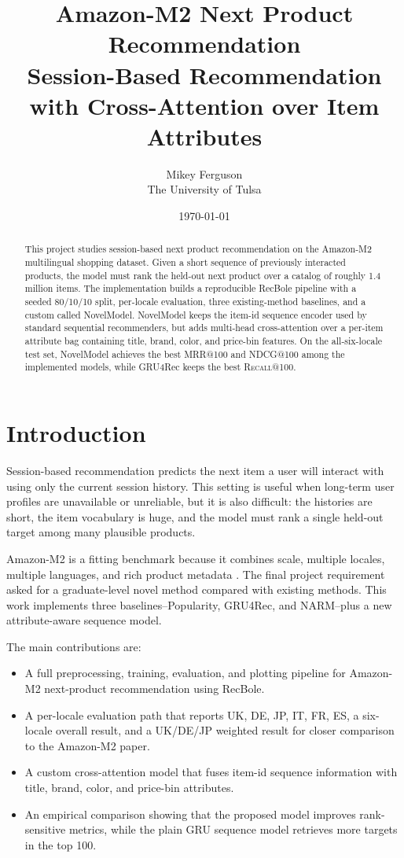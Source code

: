\documentclass[11pt]{article}
\title{\textbf{Amazon-M2 Next Product Recommendation}\\
\large Session-Based Recommendation with Cross-Attention over Item Attributes}
\author{Mikey Ferguson\\The University of Tulsa}
\date{\today}
\newcommand{\metric}[1]{\textsc{#1}}
\newcommand{\code}[1]{\texttt{\detokenize{#1}}}
\begin{document}
\maketitle

\begin{abstract}
This project studies session-based next product recommendation on the Amazon-M2 multilingual shopping dataset. Given a short sequence of previously interacted products, the model must rank the held-out next product over a catalog of roughly 1.4 million items. The implementation builds a reproducible RecBole pipeline with a seeded 80/10/10 split, per-locale evaluation, three existing-method baselines, and a custom \code{SequentialRecommender} called NovelModel. NovelModel keeps the item-id sequence encoder used by standard sequential recommenders, but adds multi-head cross-attention over a per-item attribute bag containing title, brand, color, and price-bin features. On the all-six-locale test set, NovelModel achieves the best \metric{MRR@100} and \metric{NDCG@100} among the implemented models, while GRU4Rec keeps the best \metric{Recall@100}.
\end{abstract}

\section{Introduction}

Session-based recommendation predicts the next item a user will interact with using only the current session history. This setting is useful when long-term user profiles are unavailable or unreliable, but it is also difficult: the histories are short, the item vocabulary is huge, and the model must rank a single held-out target among many plausible products.

Amazon-M2 is a fitting benchmark because it combines scale, multiple locales, multiple languages, and rich product metadata \cite{jin2023amazonm2}. The final project requirement asked for a graduate-level novel method compared with existing methods. This work implements three baselines--Popularity, GRU4Rec, and NARM--plus a new attribute-aware sequence model.

The main contributions are:
\begin{itemize}
  \item A full preprocessing, training, evaluation, and plotting pipeline for Amazon-M2 next-product recommendation using RecBole.
  \item A per-locale evaluation path that reports UK, DE, JP, IT, FR, ES, a six-locale overall result, and a UK/DE/JP weighted result for closer comparison to the Amazon-M2 paper.
  \item A custom cross-attention model that fuses item-id sequence information with title, brand, color, and price-bin attributes.
  \item An empirical comparison showing that the proposed model improves rank-sensitive metrics, while the plain GRU sequence model retrieves more targets in the top 100.
\end{itemize}
\end{document}
